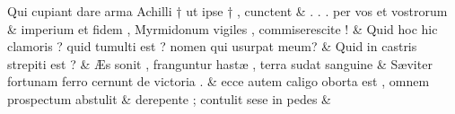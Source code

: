 \documentclass[12pt,onecolumn,twoside,a4paper]{memoir}
\begin{document}
\begin{pairs}
\begin{Leftside}
                              Qui
                              cupiant
                              dare
                              arma
                              Achilli
                              †
                              ut
                              ipse
                              †
                              ,
                              cunctent \&
                         \stanza .
                              .
                              .
                              per
                              vos
                              et
                              vostrorum &
                     imperium
                              et
                              fidem
                              ,
                              Myrmidonum
                              vigiles
                              ,
                              commiserescite
                              ! \&
                         \stanza 
                     Quid
                              hoc
                              hic
                              clamoris
                              ?
                              quid
                              tumulti
                              est
                              ?
                              nomen
                              qui
                              usurpat
                              meum? \&
                         \stanza 
                     Quid
                              in
                              castris
                              strepiti
                              est
                              ? \&
                         \stanza 
                     Æs
                              sonit
                              ,
                              franguntur
                              hastæ
                              ,
                              terra
                              sudat
                              sanguine \&
                         \stanza 
                     Sæviter
                              fortunam
                              ferro
                              cernunt
                              de
                              victoria
                              . \&
                         \stanza ecce
                              autem
                              caligo
                              oborta
                              est
                              ,
                              omnem
                              prospectum
                              abstulit &
                     derepente
                              ;
                              contulit
                              sese
                              in
                              pedes \&
                     

\end{Leftside}
\end{pairs}
\end{document}
